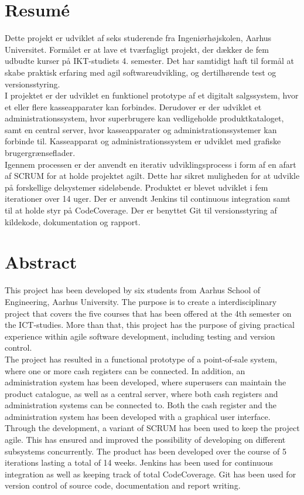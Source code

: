 \section*{Resumé}
Dette projekt er udviklet af seks studerende fra Ingeniørhøjskolen, Aarhus Universitet. Formålet er at lave et tværfagligt projekt, der dækker de fem udbudte kurser på IKT-studiets 4. semester. Det har samtidigt haft til formål at skabe praktisk erfaring med agil softwareudvikling, og dertilhørende test og versionsstyring.\\

I projektet er der udviklet en funktionel prototype af et digitalt salgssystem, hvor et eller flere kasseapparater kan forbindes. Derudover er der udviklet et administrationssystem, hvor superbrugere kan vedligeholde produktkataloget, samt en central server, hvor kasseapparater og administrationssystemer kan forbinde til. Kasseapparat og administrationssystem er udviklet med grafiske brugergrænseflader.\\

Igennem processen er der anvendt en iterativ udviklingsprocess i form af en afart af SCRUM for at holde projektet agilt. Dette har sikret muligheden for at udvikle på forskellige delsystemer sideløbende. Produktet er blevet udviklet i fem iterationer over 14 uger. Der er anvendt Jenkins til continuous integration samt til at holde styr på CodeCoverage. Der er benyttet Git til versionsstyring af kildekode, dokumentation og rapport. \\


\section*{Abstract}
This project has been developed by six students from Aarhus School of Engineering, Aarhus University. The purpose is to create a interdisciplinary project that covers the five courses that has been offered at the 4th semester on the ICT-studies. More than that, this project has the purpose of giving practical experience within agile software development, including testing and version control.\\

The project has resulted in a functional prototype of a point-of-sale system, where one or more cash registers can be connected. In addition, an administration system has been developed, where superusers can maintain the product catalogue, as well as a central server, where both cash registers and administration systems can be connected to. Both the cash register and the administration system has been developed with a graphical user interface. \\

Through the development, a variant of SCRUM has been used to keep the project agile. This has ensured and improved the possibility of developing on different subsystems concurrently. The product has been developed over the course of 5 iterations lasting a total of 14 weeks. Jenkins has been used for continuous integration as well as keeping track of total CodeCoverage. Git has been used for version control of source code, documentation and report writing. \\
